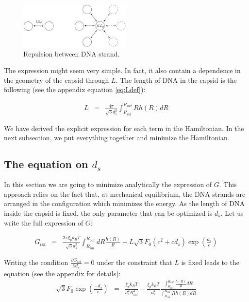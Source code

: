 \documentclass{article}
\begin{document}
\begin{figure}[H]
    \centering
    \includegraphics[width=0.5\textwidth]{diagram_Gcharge.png}
    \caption{Repulsion between DNA strand.}
    \label{fig:lattice}
\end{figure}

The expression might seem very simple. In fact, it also contain a dependence in the geometry of the capsid through $L$. The length of DNA in the capsid is the following (see the appendix equation \ref{eq:Ldef}):

\begin{eqnarray*}
    L & = & \frac{4 \pi}{\sqrt{3} d_s^2} \int_{R_{int}}^{R_{out}} R h(R) dR
\end{eqnarray*}

We have derived the explicit expression for each term in the Hamiltonian. In the next subsection, we put everything together and minimize the Hamiltonian. 
\subsection{The equation on $d_s$}

In this section we are going to minimize analytically the expression of $G$. This approach relies on the fact that, at mechanical equilibrium, the DNA strands are arranged in the configuration which minimizes the energy. As the length of DNA inside the capsid is fixed, the only parameter that can be optimized is $d_s$. Let us write the full expression of $G$:

\begin{eqnarray}
    G_{tot} &=& \frac{2 \pi \xi_p k_B T}{\sqrt{3} d_s^2} \int_{R_{int}}^{R_{out}} dR \frac{h(R)}{R} + L \sqrt{3} F_0 \left( c^2 +cd_s \right) \exp{ \left( \frac{d_s}{c} \right) }
    \label{eq:Gtot}
\end{eqnarray}

Writing the condition $ \frac{\partial G_{tot}}{\partial d_s} = 0 $ under the constraint that $L$ is fixed leads to the equation (see the appendix for details):
\begin{eqnarray}
    \sqrt{3} F_0 \exp{ \left( \frac{-d_s}{c} \right) } &=& \frac{\xi_p k_B T}{d_s^2 R_{int}^2} - \frac{\xi_p k_B T}{d_s^2} \frac{\int_{R_{int}}^{R_{out}} \frac{h(R)}{R} dR}{\int_{R_{int}}^{R_{out}} R h(R) dR} 
    \label{eq:deriv_ds_final}
\end{eqnarray}
\end{document}

